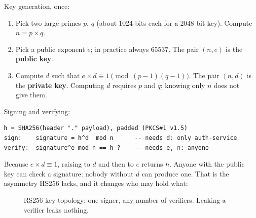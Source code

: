 Key generation, once:

\begin{enumerate}
  \item Pick two large primes $p$, $q$ (about 1024 bits each for a
  2048-bit key). Compute $n = p \times q$.
  \item Pick a public exponent $e$; in practice always $65537$. The pair
  $(n, e)$ is the \textbf{public key}.
  \item Compute $d$ such that $e \times d \equiv 1 \pmod{(p-1)(q-1)}$.
  The pair $(n, d)$ is the \textbf{private key}. Computing $d$ requires
  $p$ and $q$; knowing only $n$ does not give them.
\end{enumerate}

Signing and verifying:

\begin{lstlisting}
h = SHA256(header "." payload), padded (PKCS#1 v1.5)
sign:    signature = h^d  mod n      -- needs d: only auth-service
verify:  signature^e mod n == h ?    -- needs e, n: anyone
\end{lstlisting}

Because $e \times d \equiv 1$, raising to $d$ and then to $e$ returns
$h$. Anyone with the public key can check a signature; nobody without $d$
can produce one. That is the asymmetry HS256 lacks, and it changes who
may hold what:

\begin{figure}[htb]
\centering
{}
\caption{RS256 key topology: one signer, any number of verifiers. Leaking
a verifier leaks nothing.}
\label{fig:rs256-topology}
\end{figure}

